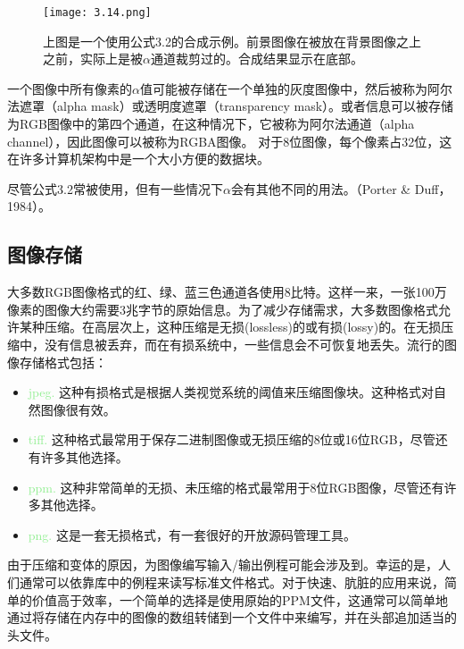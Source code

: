\documentclass[lang=cn,12pt,marginpar=margintrue]{elegantbook}
\begin{document}

\begin{figure}[htb]
  \centering
  \texttt{[image: 3.14.png]}
  \caption{上图是一个使用公式3.2的合成示例。前景图像在被放在背景图像之上之前，实际上是被$\alpha $通道裁剪过的。合成结果显示在底部。}
\end{figure}

一个图像中所有像素的$\alpha $值可能被存储在一个单独的灰度图像中，然后被称为阿尔法遮罩（alpha mask）或透明度遮罩（transparency mask）。或者信息可以被存储为RGB图像中的第四个通道，在这种情况下，它被称为阿尔法通道（alpha channel），因此图像可以被称为RGBA图像。
对于8位图像，每个像素占32位，这在许多计算机架构中是一个大小方便的数据块。

尽管公式3.2常被使用，但有一些情况下$\alpha $会有其他不同的用法。（Porter \& Duff，1984）。

\subsection{图像存储}

大多数RGB图像格式的红、绿、蓝三色通道各使用8比特。这样一来，一张100万像素的图像大约需要3兆字节的原始信息。为了减少存储需求，大多数图像格式允许某种压缩。在高层次上，这种压缩是无损(lossless)的或有损(lossy)的。在无损压缩中，没有信息被丢弃，而在有损系统中，一些信息会不可恢复地丢失。流行的图像存储格式包括：
\begin{itemize}
  \item \textcolor{lightgreen}{jpeg.} 这种有损格式是根据人类视觉系统的阈值来压缩图像块。这种格式对自然图像很有效。
  \item \textcolor{lightgreen}{tiff.} 这种格式最常用于保存二进制图像或无损压缩的8位或16位RGB，尽管还有许多其他选择。
  \item \textcolor{lightgreen}{ppm.} 这种非常简单的无损、未压缩的格式最常用于8位RGB图像，尽管还有许多其他选择。
  \item \textcolor{lightgreen}{png.} 这是一套无损格式，有一套很好的开放源码管理工具。
\end{itemize}
由于压缩和变体的原因，为图像编写输入/输出例程可能会涉及到。幸运的是，人们通常可以依靠库中的例程来读写标准文件格式。对于快速、肮脏的应用来说，简单的价值高于效率，一个简单的选择是使用原始的PPM文件，这通常可以简单地通过将存储在内存中的图像的数组转储到一个文件中来编写，并在头部追加适当的头文件。
\end{document}
